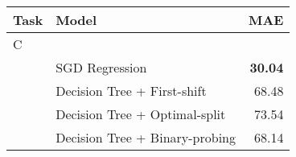 \documentclass[11pt, convert]{standalone}
\begin{document}
\begin{tabular}{llr}
	\toprule
	Task             & Model                   & MAE           \\
	\midrule
	C                &                         &               \\
									 & SGD Regression          & \textbf{30.04}            \\
									 & Decision Tree + First-shift             & 68.48            \\
									 & Decision Tree + Optimal-split           & 73.54            \\
									 & Decision Tree + Binary-probing          & 68.14            \\
	\bottomrule
\end{tabular}
\end{document}
